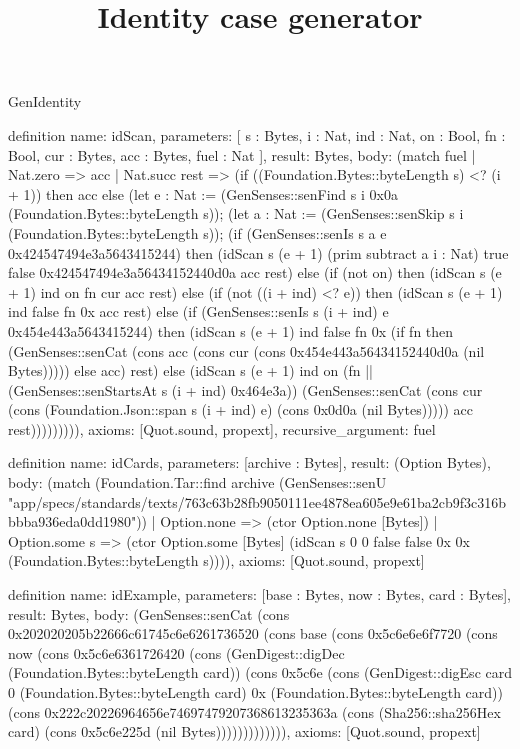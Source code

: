 \begin{lexlean}{GenIdentity}
\title{Identity case generator}
\begin{semanticmodule}
definition{
  name: idScan,
  parameters: [
    s : Bytes,
    i : Nat,
    ind : Nat,
    on : Bool,
    fn : Bool,
    cur : Bytes,
    acc : Bytes,
    fuel : Nat
  ],
  result: Bytes,
  body: (match fuel
    | Nat.zero => acc
    | Nat.succ rest => (if ((Foundation.Bytes::byteLength s) <? (i + 1)) then acc else (let e : Nat := (GenSenses::senFind s i 0x0a (Foundation.Bytes::byteLength s)); (let a : Nat := (GenSenses::senSkip s i (Foundation.Bytes::byteLength s)); (if (GenSenses::senIs s a e 0x424547494e3a5643415244) then (idScan s (e + 1) (prim subtract a i : Nat) true false 0x424547494e3a56434152440d0a acc rest) else (if (not on) then (idScan s (e + 1) ind on fn cur acc rest) else (if (not ((i + ind) <? e)) then (idScan s (e + 1) ind false fn 0x acc rest) else (if (GenSenses::senIs s (i + ind) e 0x454e443a5643415244) then (idScan s (e + 1) ind false fn 0x (if fn then (GenSenses::senCat (cons acc (cons cur (cons 0x454e443a56434152440d0a (nil Bytes))))) else acc) rest) else (idScan s (e + 1) ind on (fn || (GenSenses::senStartsAt s (i + ind) 0x464e3a)) (GenSenses::senCat (cons cur (cons (Foundation.Json::span s (i + ind) e) (cons 0x0d0a (nil Bytes))))) acc rest))))))))),
  axioms: [Quot.sound, propext],
  recursive_argument: fuel
}

definition{
  name: idCards,
  parameters: [archive : Bytes],
  result: (Option Bytes),
  body: (match (Foundation.Tar::find archive (GenSenses::senU "app/specs/standards/texts/763c63b28fb9050111ee4878ea605e9e61ba2cb9f3c316bbbba936eda0dd1980"))
    | Option.none => (ctor Option.none [Bytes])
    | Option.some s => (ctor Option.some [Bytes] (idScan s 0 0 false false 0x 0x (Foundation.Bytes::byteLength s)))),
  axioms: [Quot.sound, propext]
}

definition{
  name: idExample,
  parameters: [base : Bytes, now : Bytes, card : Bytes],
  result: Bytes,
  body: (GenSenses::senCat (cons 0x202020205b22666c61745c6e6261736520 (cons base (cons 0x5c6e6e6f7720 (cons now (cons 0x5c6e6361726420 (cons (GenDigest::digDec (Foundation.Bytes::byteLength card)) (cons 0x5c6e (cons (GenDigest::digEsc card 0 (Foundation.Bytes::byteLength card) 0x (Foundation.Bytes::byteLength card)) (cons 0x222c20226964656e74697479207368613235363a (cons (Sha256::sha256Hex card) (cons 0x5c6e225d (nil Bytes))))))))))))),
  axioms: [Quot.sound, propext]
}


\end{semanticmodule}
\end{lexlean}
